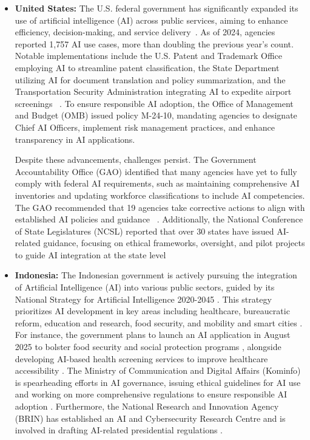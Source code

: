\documentclass[12pt]{report}
\begin{document}
\begin{itemize}
    \item \textbf{United States:} The U.S. federal government has significantly expanded its use of artificial intelligence (AI) across public services, aiming to enhance efficiency, decision-making, and service delivery~\cite{ncsl2024ai}. As of 2024, agencies reported 1,757 AI use cases, more than doubling the previous year's count. Notable implementations include the U.S. Patent and Trademark Office employing AI to streamline patent classification, the State Department utilizing AI for document translation and policy summarization, and the Transportation Security Administration integrating AI to expedite airport screenings~\cite{brookings2024ai} . To ensure responsible AI adoption, the Office of Management and Budget (OMB) issued policy M-24-10, mandating agencies to designate Chief AI Officers, implement risk management practices, and enhance transparency in AI applications\cite{OMB-M-24-10}.
    
    Despite these advancements, challenges persist. The Government Accountability Office (GAO) identified that many agencies have yet to fully comply with federal AI requirements, such as maintaining comprehensive AI inventories and updating workforce classifications to include AI competencies. The GAO recommended that 19 agencies take corrective actions to align with established AI policies and guidance~\cite{gao2024ai} . Additionally, the National Conference of State Legislatures (NCSL) reported that over 30 states have issued AI-related guidance, focusing on ethical frameworks, oversight, and pilot projects to guide AI integration at the state level~\cite{ncsl2024ai}

    \item \textbf{Indonesia:} The Indonesian government is actively pursuing the integration of Artificial Intelligence (AI) into various public sectors, guided by its National Strategy for Artificial Intelligence 2020-2045 \cite{mfat_indonesia_ai_strategy_2023, investjakarta_ai_global_trends_2025}. This strategy prioritizes AI development in key areas including healthcare, bureaucratic reform, education and research, food security, and mobility and smart cities \cite{mfat_indonesia_ai_strategy_2023}. For instance, the government plans to launch an AI application in August 2025 to bolster food security and social protection programs \cite{techinasia_indonesia_ai_2025}, alongside developing AI-based health screening services to improve healthcare accessibility \cite{govinsider_navigating_ai_2025}. The Ministry of Communication and Digital Affairs (Kominfo) is spearheading efforts in AI governance, issuing ethical guidelines for AI use and working on more comprehensive regulations to ensure responsible AI adoption \cite{opengovasia_indonesia_ai_strategy_2025, govinsider_navigating_ai_2025}. Furthermore, the National Research and Innovation Agency (BRIN) has established an AI and Cybersecurity Research Centre and is involved in drafting AI-related presidential regulations \cite{opengovasia_indonesia_ai_strategy_2025}. 
    

\end{itemize}
\end{document}
